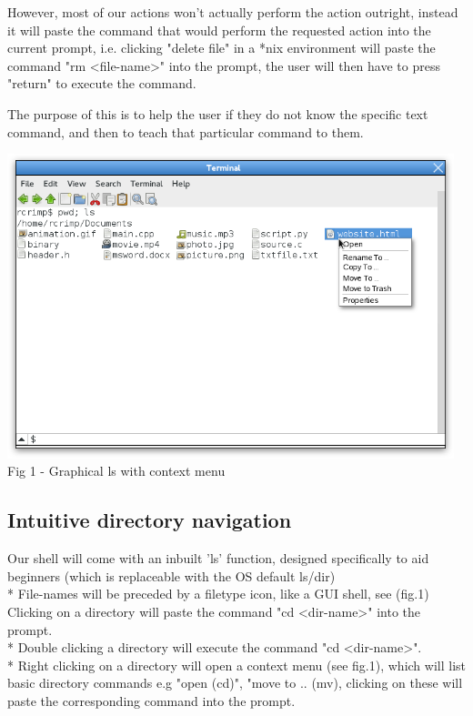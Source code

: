 \documentclass[a4paper,12pt]{article}
\begin{document}
However, most of our actions won't actually perform the action outright, instead it will paste the command that would perform the requested action into the current prompt, i.e. clicking "delete file" in a *nix environment will paste the command "rm \textless file-name\textgreater" into the prompt, the user will then have to press "return" to execute the command.

The purpose of this is to help the user if they do not know the specific text command, and then to teach that particular command to them.

\begin{center}
  \includegraphics[width=13cm]{context.png}\\
  \small Fig 1 - Graphical ls with context menu
\end{center}
\subsection*{Intuitive directory navigation}
Our shell will come with an inbuilt 'ls' function, designed specifically to aid beginners
(which is replaceable with the OS default ls/dir)\\*
File-names will be preceded by a filetype icon, like a GUI shell, see (fig.1)\\

Clicking on a directory will paste the command "cd \textless dir-name\textgreater" into the prompt.\\*
Double clicking a directory will execute the command "cd \textless dir-name\textgreater".\\*
Right clicking on a directory will open a context menu (see fig.1), which will list basic directory commands e.g "open (cd)", "move to .. (mv), clicking on these will paste the corresponding command into the prompt.
\end{document}
